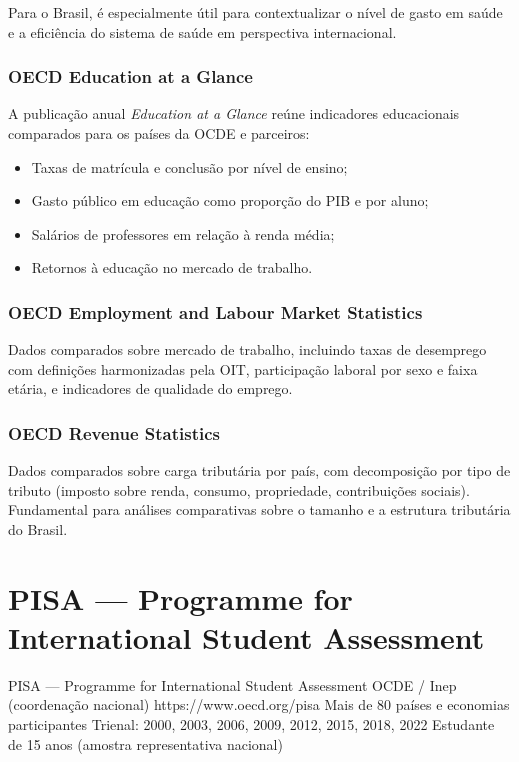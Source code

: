 Para o Brasil, é especialmente útil para contextualizar o nível de gasto em saúde e a eficiência do sistema de saúde em perspectiva internacional.

\subsubsection{OECD Education at a Glance}

A publicação anual \textit{Education at a Glance} reúne indicadores educacionais comparados para os países da OCDE e parceiros:
\begin{itemize}
  \item Taxas de matrícula e conclusão por nível de ensino;
  \item Gasto público em educação como proporção do PIB e por aluno;
  \item Salários de professores em relação à renda média;
  \item Retornos à educação no mercado de trabalho.
\end{itemize}

\subsubsection{OECD Employment and Labour Market Statistics}

Dados comparados sobre mercado de trabalho, incluindo taxas de desemprego com definições harmonizadas pela OIT, participação laboral por sexo e faixa etária, e indicadores de qualidade do emprego.

\subsubsection{OECD Revenue Statistics}

Dados comparados sobre carga tributária por país, com decomposição por tipo de tributo (imposto sobre renda, consumo, propriedade, contribuições sociais). Fundamental para análises comparativas sobre o tamanho e a estrutura tributária do Brasil.

\section{PISA --- Programme for International Student Assessment}

\ficharapida
  {PISA --- Programme for International Student Assessment}
  {OCDE / Inep (coordenação nacional)}
  {https://www.oecd.org/pisa}
  {Mais de 80 países e economias participantes}
  {Trienal: 2000, 2003, 2006, 2009, 2012, 2015, 2018, 2022}
  {Estudante de 15 anos (amostra representativa nacional)}

